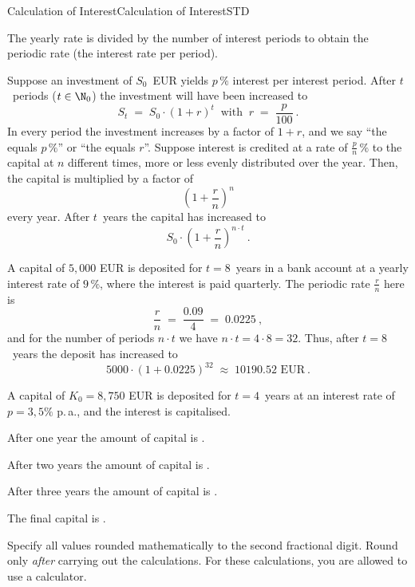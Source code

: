 \begin{MXContent}{Calculation of Interest}{Calculation of Interest}{STD}
\begin{MInfo}
The yearly rate is divided by the number of interest periods to obtain the 
periodic rate (the interest rate per period).
\end{MInfo}

Suppose an investment of $S_{0}$~EUR yields $p\,\%$ interest per interest period. After 
$t$~periods ($t\in \N_0$) the investment will have been increased to
$$
S_{t} \;=\; S_{0}\cdot (1+r)^{t} \;\;\text{with}\;\; r\;=\;\frac{p}{100}\: .
$$
In every period the investment increases by a factor of $1+r$, and we say ``the 
 equals $p\,\%$'' or ``the 
 equals $r$''. Suppose interest is credited  at a rate of 
$\frac{p}{n}\,\%$ to the capital at $n$ different times, more or less evenly distributed 
over the year.  Then, the capital is multiplied by a factor of 
$$
\left(1+\frac{r}{n}\right)^{n}
$$
every year. After $t$~years the capital has increased to
$$
S_{0}\cdot \left(1+\frac{r}{n} \right)^{n\cdot t}\: .
$$

\begin{MExample}
A capital of $5{,}000$ EUR is deposited for $t=8$~years in a bank account at a yearly interest rate of 
$9\,\%$, where the interest is paid quarterly. The periodic rate $\frac{r}{n}$ here is 
$$
\frac{r}{n} \;=\;\frac{0.09}{4} \; =\; 0.0225 \: ,
$$
and for the number of periods $n\cdot t$ we have 
$n\cdot t = 4\cdot 8=32$. Thus, after $t=8$~years the deposit has increased to
$$
5000\cdot (1+0.0225)^{32}\; \approx \;10190.52 \text{ EUR}\: .
$$
\end{MExample}


\begin{MExercise}
A capital of $K_0=8{,}750$ EUR is deposited for $t=4$~years at an interest rate of $p=3,5\%$ p.\,a., and
the interest is capitalised.
\begin{MExerciseItems}
\item{After one year the amount of capital is .}
\item{After two years the amount of capital is .}
\item{After three years the amount of capital is .}
\item{The final capital is .}
\end{MExerciseItems}
Specify all values rounded mathematically to the second fractional digit. Round only \textit{after}
carrying out the calculations. For these calculations, you are allowed to use a calculator.



\end{MExercise}
\end{MXContent}
